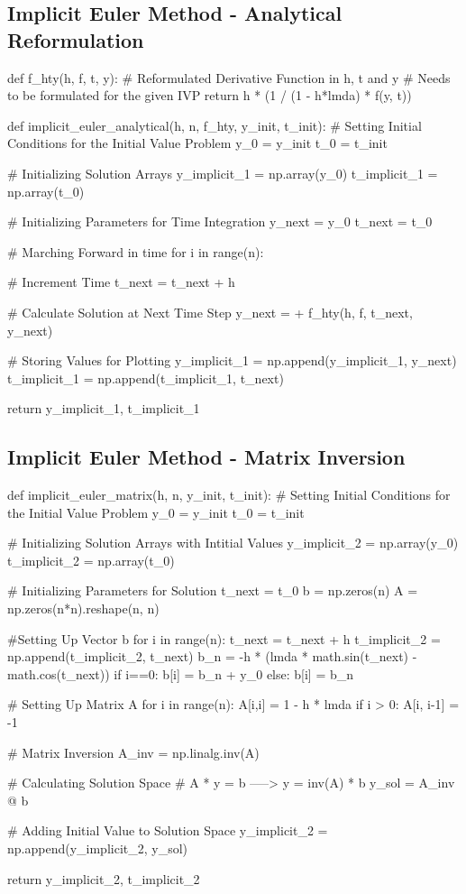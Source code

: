 \subsection{Implicit Euler Method - Analytical Reformulation}
\begin{python}
def f_hty(h, f, t, y):
    # Reformulated Derivative Function in h, t and y
    # Needs to be formulated for the given IVP
    return h * (1 / (1 - h*lmda) * f(y, t))

def implicit_euler_analytical(h, n, f_hty, y_init, t_init):
    # Setting Initial Conditions for the Initial Value Problem
    y_0 = y_init
    t_0 = t_init
	
    # Initializing Solution Arrays
    y_implicit_1 = np.array(y_0)
    t_implicit_1 = np.array(t_0)

    # Initializing Parameters for Time Integration
    y_next = y_0
    t_next = t_0

    # Marching Forward in time
    for i in range(n):

        # Increment Time
        t_next = t_next + h 

        # Calculate Solution at Next Time Step
        y_next = 
         + f_hty(h, f, t_next, y_next)

        # Storing Values for Plotting
        y_implicit_1 = np.append(y_implicit_1, y_next)
        t_implicit_1 = np.append(t_implicit_1, t_next)

    return y_implicit_1, t_implicit_1
\end{python}

\subsection{Implicit Euler Method - Matrix Inversion}
\begin{python}
def implicit_euler_matrix(h, n, y_init, t_init):
    # Setting Initial Conditions for the Initial Value Problem
    y_0 = y_init
    t_0 = t_init

    # Initializing Solution Arrays with Intitial Values
    y_implicit_2 = np.array(y_0)
    t_implicit_2 = np.array(t_0)

    # Initializing Parameters for Solution
    t_next = t_0
    b = np.zeros(n)
    A = np.zeros(n*n).reshape(n, n)

    #Setting Up Vector b
    for i in range(n):
        t_next = t_next + h
        t_implicit_2 = np.append(t_implicit_2, t_next)
        b_n = -h * (lmda * math.sin(t_next) - math.cos(t_next))
        if i==0:
            b[i] = b_n + y_0
        else:
            b[i] = b_n


    # Setting Up Matrix A
    for i in range(n):
        A[i,i] = 1 - h * lmda
        if i > 0:
            A[i, i-1] = -1

    # Matrix Inversion
    A_inv = np.linalg.inv(A)

    # Calculating Solution Space
    # A * y = b -----> y = inv(A) * b
    y_sol = A_inv @ b

    # Adding Initial Value to Solution Space
    y_implicit_2 = np.append(y_implicit_2, y_sol)

    return y_implicit_2, t_implicit_2
\end{python}

